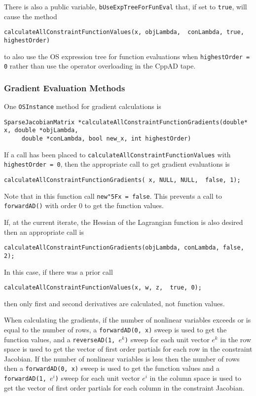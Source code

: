 \documentclass[11pt]{article}
\renewcommand{\_}{{\char"5F}}
\renewcommand{\{}{{\char"7B}}
\renewcommand{\}}{{\char"7D}}
\renewcommand{\^}{{\char"0D}}
\renewcommand{\'}{{\char"0D}}
\begin{document}
There is also a public variable, {\tt bUseExpTreeForFunEval} that, if set to {\tt true}, will cause the method
\begin{verbatim}
calculateAllConstraintFunctionValues(x, objLambda,  conLambda, true, highestOrder)
\end{verbatim}
to also use the OS expression tree for function evaluations when {\tt highestOrder = 0} rather than use the operator overloading in the CppAD tape.

\subsubsection{Gradient Evaluation Methods}

One {\tt OSInstance} method for gradient calculations is
\begin{verbatim}
SparseJacobianMatrix *calculateAllConstraintFunctionGradients(double* x, double *objLambda, 
     double *conLambda, bool new_x, int highestOrder)
\end{verbatim}
If a call has been placed to {\tt calculateAllConstraintFunctionValues} with {\tt highestOrder = 0}, then the appropriate call to get gradient evaluations is
\begin{verbatim}
calculateAllConstraintFunctionGradients( x, NULL, NULL,  false, 1);
\end{verbatim}
Note that in this function call {\tt new\_x = false}. This prevents a call to {\tt forwardAD()} with order 0 to get the function values. 


If, at the current iterate, the Hessian of the Lagrangian function is also desired then an appropriate call is
\begin{verbatim}
calculateAllConstraintFunctionGradients(objLambda, conLambda, false, 2);
\end{verbatim}
In this case, if there was a prior call 
\begin{verbatim}
calculateAllConstraintFunctionValues(x, w, z,  true, 0);
\end{verbatim}
then only first and second derivatives are calculated, not function values. 

When calculating the gradients, if the number of nonlinear variables exceeds or is equal  to the number of rows,  a {\tt forwardAD(0, x)} sweep is used to get the function values,  and   a {\tt reverseAD(1, $e^{k}$)}  sweep for each unit vector  $e^{k}$ in the row space  is used to get the vector of first order partials for each row in the constraint Jacobian.  If the number of nonlinear variables is less then the number of rows then a {\tt forwardAD(0, x)} sweep  is used to get the function values and a {\tt forwardAD(1,  $e^{i}$)}  sweep for each unit vector  $e^{i}$ in the column space is used to get the vector of first order partials for each column in the constraint Jacobian. 
\end{document}
